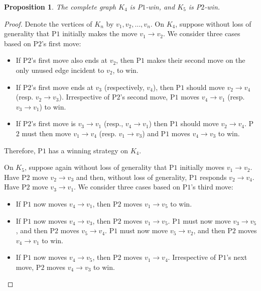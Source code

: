 \documentclass{article}
\theoremstyle{plain}
\newtheorem{proposition}[theorem]{Proposition}
\theoremstyle{definition}
\def\pone{{\rm{P}\ensuremath{1}}}
\def\ptwo{{\rm{P}\ensuremath{2}}}
\def\poneposs{{\rm{P}\ensuremath{1}'s}}
\def\ptwoposs{{\rm{P}\ensuremath{2}'s}}
\begin{document}
\begin{proposition}
\label{prop:K_4}
    The complete graph $K_4$ is \pone{}-win, and $K_5$ is \ptwo{}-win. 
\end{proposition}
\begin{proof}
    Denote the vertices of $K_n$ by $v_1,v_2,\dots,v_n$. On $K_4$, suppose without loss of generality that \pone{} initially makes the move $v_1 \to v_2$.  We consider three cases based on \ptwoposs{} first move: 
    \begin{itemize}
    \item [(i)] If \ptwoposs{} first move also ends at $v_2$, then \pone{} makes their second move on the only unused edge incident to $v_2$, to win.
    \item [(ii)] If \ptwoposs{} first move ends at $v_3$ (respectively, $v_4$), then \pone{} should move $v_2 \to v_4$ (resp. $v_2 \to v_3$). Irrespective of \ptwoposs{} second move, \pone{} moves $v_4 \to v_1$ (resp. $v_3 \to v_1$) to win. 
    \item [(iii)] If \ptwoposs{} first move is $v_3 \to v_1$ (resp., $v_4 \to v_1$) then \pone{} should move $v_2 \to v_4$. \ptwo{} must then move $v_1 \to v_4$ (resp. $v_1 \to v_3$) and \pone{} moves $v_4 \to v_3$ to win.   
    \end{itemize}   

    Therefore, \pone{} has a winning strategy on $K_4$. 
    
    On $K_5$, suppose again without loss of generality that \pone{} initially moves $v_1 \to v_2$. Have \ptwo{} move $v_2 \to v_3$ and then, without loss of generality, \pone{} responds $v_2 \to v_4$. Have \ptwo{} move $v_3 \to v_1$. We consider three cases based on \poneposs{} third move: 
    
    \begin{itemize}
    \item [(i)] If \pone{} now moves $v_4 \to v_1$, then \ptwo{} moves $v_1 \to v_5$ to win.  
    \item [(ii)] If \pone{} now moves $v_4 \to v_3$, then \ptwo{} moves $v_1 \to v_5$. \pone{} must now move $v_3 \to v_5$, and then \ptwo{} moves $v_5 \to v_4$. \pone{} must now move $v_5 \to v_2$, and then \ptwo{} moves $v_4 \to v_1$ to win. 
    \item [(iii)] If \pone{} now moves $v_4 \to v_5$, then \ptwo{} moves $v_1 \to v_4$. Irrespective of \poneposs{} next move, \ptwo{} moves $v_4 \to v_3$ to win. \hfill \qedhere
    \end{itemize}
\end{proof}
\end{document}
